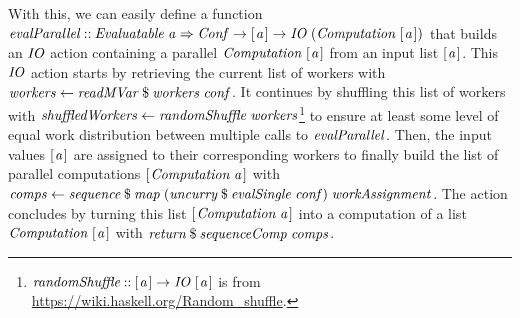 \documentclass[paper=A4,twoside=true,openright,parskip=full,chapterprefix=true,headings=normal,bibliography=totoc,listof=totoc,titlepage=on,captions=tableabove,draft=false,british]{scrreprt}%
\begin{document}
With this, we can easily define a function
\ensuremath{\Varid{evalParallel}\mathbin{::}\Conid{Evaluatable}\;\Varid{a}\Rightarrow \Conid{Conf}\to [\mskip1.5mu \Varid{a}\mskip1.5mu]\to \Conid{IO}\;(\Conid{Computation}\;[\mskip1.5mu \Varid{a}\mskip1.5mu])}
that builds an \ensuremath{\Conid{IO}} action containing a parallel \linebreak \ensuremath{\Conid{Computation}\;[\mskip1.5mu \Varid{a}\mskip1.5mu]} from
an input list \ensuremath{[\mskip1.5mu \Varid{a}\mskip1.5mu]}. This \ensuremath{\Conid{IO}} action starts by retrieving the current
list of workers with \ensuremath{\Varid{workers}\leftarrow \Varid{readMVar}\mathbin{\$}\Varid{workers}\;\Varid{conf}}. It continues
by shuffling this list of workers with
\ensuremath{\Varid{shuffledWorkers}\leftarrow \Varid{randomShuffle}\;\Varid{workers}}\footnote{\ensuremath{\Varid{randomShuffle}\mathbin{::}[\mskip1.5mu \Varid{a}\mskip1.5mu]\to \Conid{IO}\;[\mskip1.5mu \Varid{a}\mskip1.5mu]}
  is from \url{https://wiki.haskell.org/Random_shuffle}.} to ensure at
least some level of equal work distribution between multiple calls to
\ensuremath{\Varid{evalParallel}}. Then, the input values \ensuremath{[\mskip1.5mu \Varid{a}\mskip1.5mu]} are assigned to their
corresponding workers to finally build the list of parallel computations
\ensuremath{[\mskip1.5mu \Conid{Computation}\;\Varid{a}\mskip1.5mu]} with
\ensuremath{\Varid{comps}\leftarrow \Varid{sequence}\mathbin{\$}\Varid{map}\;(\Varid{uncurry}\mathbin{\$}\Varid{evalSingle}\;\Varid{conf})\;\Varid{workAssignment}}.
The action concludes by turning this list \ensuremath{[\mskip1.5mu \Conid{Computation}\;\Varid{a}\mskip1.5mu]} into a
computation of a list \ensuremath{\Conid{Computation}\;[\mskip1.5mu \Varid{a}\mskip1.5mu]} with
\ensuremath{\Varid{return}\mathbin{\$}\Varid{sequenceComp}\;\Varid{comps}}.
\end{document}
